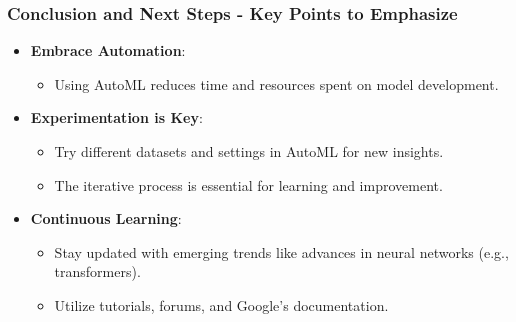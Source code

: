 \documentclass[aspectratio=169]{beamer}
\begin{document}
\begin{frame}[fragile]
  \frametitle{Conclusion and Next Steps - Key Points to Emphasize}

  \begin{itemize}
      \item \textbf{Embrace Automation}: 
          \begin{itemize}
              \item Using AutoML reduces time and resources spent on model development.
          \end{itemize}

      \item \textbf{Experimentation is Key}: 
          \begin{itemize}
              \item Try different datasets and settings in AutoML for new insights.
              \item The iterative process is essential for learning and improvement.
          \end{itemize}

      \item \textbf{Continuous Learning}: 
          \begin{itemize}
              \item Stay updated with emerging trends like advances in neural networks (e.g., transformers).
              \item Utilize tutorials, forums, and Google’s documentation.
          \end{itemize}
  \end{itemize}
\end{frame}
\end{document}
